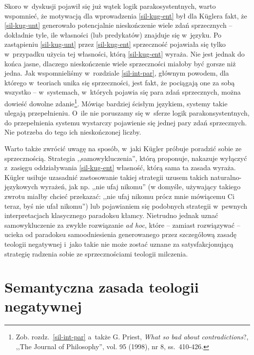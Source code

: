 Skoro w~dyskusji pojawił się już wątek logik parakosystentnych, warto wspomnieć, że motywacją dla wprowadzenia \ref{sil-kug-ent} był dla Küglera fakt, że \ref{sil-kug-unt} generowało potencjalnie nieskończenie wiele zdań sprzecznych -- dokładnie tyle, ile własności (lub predykatów) znajduje się w~języku. Po zastąpieniu \ref{sil-kug-unt} przez \ref{sil-kug-ent} sprzeczność pojawiała się tylko w~przypadku użycia tej własności, którą \ref{sil-kug-ent} wyraża. Nie jest jednak do końca jasne, dlaczego nieskończenie wiele sprzeczności miałoby być gorsze niż jedna. Jak wspomnieliśmy w~rozdziale \ref{sil-int-par}, głównym powodem, dla którego w~teoriach unika się sprzeczności, jest fakt, że pociągają one za sobą wszystko -- w~systemach, w~których pojawia się para zdań sprzecznych, można dowieść dowolne zdanie\footnote{Zob. rozdz.~\ref{sil-int-par} a~także G. Priest, \textit{What so bad about contradictions}?, ,,The Journal of Philosophy'', vol. 95 (1998), nr 8, ss.~410-426.}. Mówiąc bardziej ścisłym językiem, systemy takie ulegają przepełnieniu. O~ile nie poruszamy się w~sferze logik parakonsystentnych, do przepełnienia systemu wystarczy pojawienie się jednej pary zdań sprzecznych. Nie potrzeba do tego ich nieskończonej liczby.

Warto także zwrócić uwagę na sposób, w~jaki Kügler próbuje poradzić sobie ze sprzecznością. Strategia ,,samowykluczenia'', którą proponuje, nakazuje wyłączyć z~zasięgu oddziaływania \ref{sil-kug-ent} własność, którą sama ta zasada wyraża. Kügler usiłuje uzasadnić zastosowanie takiej strategii uzusem takich naturalno-językowych wyrażeń, jak np. ,,nie ufaj nikomu'' (w domyśle, używający takiego zwrotu miałby chcieć przekazać: ,,nie ufaj nikomu prócz mnie mówiącemu Ci teraz, byś nie ufał nikomu'') lub pojawianiem się podobnych strategii w~pewnych interpretacjach klasycznego paradoksu kłamcy. Nietrudno jednak uznać samowykluczenie za zwykłe rozwiązanie \textit{ad hoc}, które -- zamiast rozwiązywać -- ucieka od paradoksu samoodniesienia generowanego przez szczegółową zasadę teologii negatywnej i~jako takie nie może zostać uznane za satysfakcjonującą strategię radzenia sobie ze sprzecznościami teologii milczenia.


\chapter{Semantyczna zasada teologii negatywnej}\label{sil-gell}

